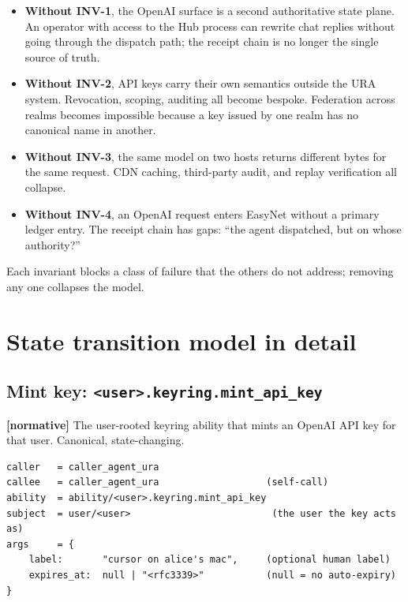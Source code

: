 \documentclass[11pt,a4paper]{article}
\newcommand{\normsv}{\textcolor{normativecolor}{\textbf{[normative]}}\xspace}
\theoremstyle{definition}
\begin{document}
\begin{itemize}[leftmargin=2em,itemsep=0.18em]
    \item \textbf{Without INV-1}, the OpenAI surface is a second
    authoritative state plane. An operator with access to the
    Hub process can rewrite chat replies without going through
    the dispatch path; the receipt chain is no longer the single
    source of truth.
    \item \textbf{Without INV-2}, API keys carry their own
    semantics outside the URA system. Revocation, scoping,
    auditing all become bespoke. Federation across realms
    becomes impossible because a key issued by one realm has
    no canonical name in another.
    \item \textbf{Without INV-3}, the same model on two hosts
    returns different bytes for the same request. CDN caching,
    third-party audit, and replay verification all collapse.
    \item \textbf{Without INV-4}, an OpenAI request enters
    EasyNet without a primary ledger entry. The receipt chain
    has gaps: ``the agent dispatched, but on whose authority?''
\end{itemize}

Each invariant blocks a class of failure that the others do not
address; removing any one collapses the model.

\section{State transition model in detail}
\label{sec:transitions}

\subsection{Mint key: \texttt{<user>.keyring.mint\_api\_key}}

\normsv{} The user-rooted keyring ability that mints an OpenAI
API key for that user. Canonical, state-changing.

\begin{lstlisting}
caller   = caller_agent_ura
callee   = caller_agent_ura                   (self-call)
ability  = ability/<user>.keyring.mint_api_key
subject  = user/<user>                         (the user the key acts as)
args     = {
    label:       "cursor on alice's mac",     (optional human label)
    expires_at:  null | "<rfc3339>"           (null = no auto-expiry)
}
\end{lstlisting}
\end{document}
